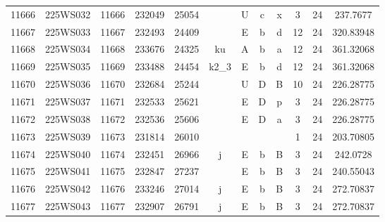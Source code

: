 \begin{tabular}{|*{12}{c|}}
11666 & 225WS032 & 11666 & 232049 & 25054 &  & U & c & x & 3 & 24 & 237.7677 \\ 
11667 & 225WS033 & 11667 & 232493 & 24409 &  & E & b & d & 12 & 24 & 320.83948 \\ 
11668 & 225WS034 & 11668 & 233676 & 24325 & ku & A & b & a & 12 & 24 & 361.32068 \\ 
11669 & 225WS035 & 11669 & 233488 & 24454 & k2\_3 & E & b & d & 12 & 24 & 361.32068 \\ 
11670 & 225WS036 & 11670 & 232684 & 25244 &  & U & D & B & 10 & 24 & 226.28775 \\ 
11671 & 225WS037 & 11671 & 232533 & 25621 &  & E & D & p & 3 & 24 & 226.28775 \\ 
11672 & 225WS038 & 11672 & 232536 & 25606 &  & E & D & a & 3 & 24 & 226.28775 \\ 
11673 & 225WS039 & 11673 & 231814 & 26010 &  &  &  &  & 1 & 24 & 203.70805 \\ 
11674 & 225WS040 & 11674 & 232451 & 26966 & j & E & b & B & 3 & 24 & 242.0728 \\ 
11675 & 225WS041 & 11675 & 232847 & 27237 &  & E & b & B & 3 & 24 & 240.55043 \\ 
11676 & 225WS042 & 11676 & 233246 & 27014 & j & E & b & B & 3 & 24 & 272.70837 \\ 
11677 & 225WS043 & 11677 & 232907 & 26791 & j & E & b & B & 3 & 24 & 272.70837
\end{tabular}